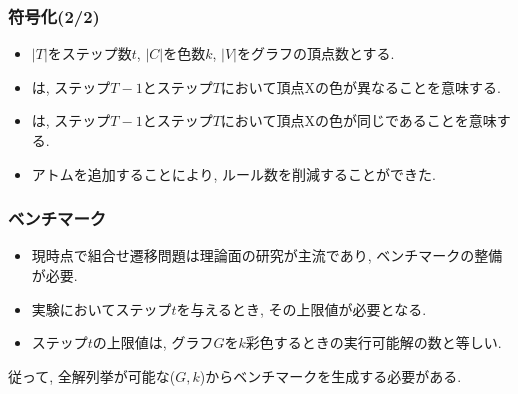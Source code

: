 \documentclass[dvipdfmx,11pt]{beamer}
\begin{document}

\begin{frame}\frametitle{符号化(2/2)}

  \begin{itemize}
    \item $|T|$をステップ数$t$, $|C|$を色数$k$, $|V|$をグラフの頂点数とする.
    
  \end{itemize}

  \begin{table}[t]
    \centering
    
  \end{table}

  \begin{itemize}
    \item {}は, ステップ$T-1$とステップ$T$において頂点Xの色が異なることを意味する.
    \item {}は, ステップ$T-1$とステップ$T$において頂点Xの色が同じであることを意味する.
    \item アトムを追加することにより, ルール数を削減することができた.
  \end{itemize}
  
\end{frame}


\begin{frame}\frametitle{ベンチマーク}

  \begin{itemize}
    \item 現時点で組合せ遷移問題は理論面の研究が主流であり, ベンチマークの整備が必要.
    \item 実験においてステップ$t$を与えるとき, その上限値が必要となる.
    \item ステップ$t$の上限値は, グラフ$G$を$k$彩色するときの実行可能解の数と等しい.
  \end{itemize}

  従って, 全解列挙が可能な($G, k$)からベンチマークを生成する必要がある.
  
\end{frame}

\end{document}

